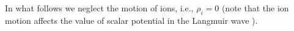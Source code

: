 \documentclass[10pt, a4paper, twoside, openright]{report}
\newcommand{\norm}[1]{\lVert#1\rVert}
\renewcommand{\vec}[1]{\boldsymbol{\mathrm{#1}}}
\begin{document}
In what follows we neglect the motion of ions, i.e., $ \rho_i = 0 $ (note that the ion motion affects the value of scalar potential in the Langmuir wave \cite{Bulanov2021}). 

\end{document}
